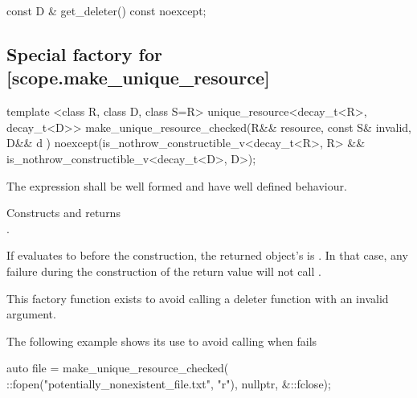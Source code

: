 \documentclass[ebook,11pt,article]{memoir}
\begin{document}
\begin{itemdecl}
const D & get_deleter() const noexcept;
\end{itemdecl}

\begin{itemdescr}
\pnum
\returns {}
\end{itemdescr}

\newpage
\subsection {Special factory for  [scope.make_unique_resource]}

\begin{itemdecl}
template <class R, class D, class S=R>
unique_resource<decay_t<R>, decay_t<D>>
make_unique_resource_checked(R&& resource, const S& invalid, D&& d ) 
noexcept(is_nothrow_constructible_v<decay_t<R>, R> &&
         is_nothrow_constructible_v<decay_t<D>, D>);
\end{itemdecl}

\begin{itemdescr}
\pnum
\requires The expression  shall be well formed and have well defined behaviour.

\pnum
\effects Constructs and returns \\
. 

\pnum
If  evaluates to  before the construction, the returned  object's  is . 
In that case, any failure during the construction of the return value will not call .

\pnum
\begin{note}
This factory function exists to avoid calling a deleter function with an invalid argument. 
\end{note}

\pnum
\begin{example}
The following example shows its use to avoid calling  when  fails
\begin{codeblock}
auto file = make_unique_resource_checked(
  ::fopen("potentially_nonexistent_file.txt", "r"), 
  nullptr, &::fclose);
\end{codeblock}
\end{example}

\end{itemdescr}
\end{document}
